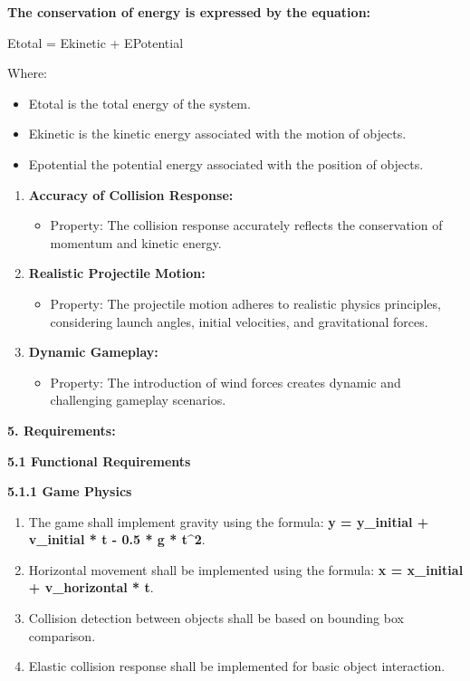 \documentclass[
]{article}
\begin{document}
\textbf{The conservation of energy is expressed by the equation:}

Etotal = Ekinetic + EPotential

Where:

\begin{itemize}
\item
  Etotal is the total energy of the system.
\item
  Ekinetic is the kinetic energy associated with the motion of objects.
\item
  Epotential the potential energy associated with the position of
  objects.
\end{itemize}

\begin{enumerate}
\def\labelenumi{\arabic{enumi}.}
\setcounter{enumi}{1}
\item
  \textbf{Accuracy of Collision Response:}

  \begin{itemize}
  \item
    Property: The collision response accurately reflects the
    conservation of momentum and kinetic energy.
  \end{itemize}
\item
  \textbf{Realistic Projectile Motion:}

  \begin{itemize}
  \item
    Property: The projectile motion adheres to realistic physics
    principles, considering launch angles, initial velocities, and
    gravitational forces.
  \end{itemize}
\item
  \textbf{Dynamic Gameplay:}

  \begin{itemize}
  \item
    Property: The introduction of wind forces creates dynamic and
    challenging gameplay scenarios.
  \end{itemize}
\end{enumerate}

\protect\hypertarget{qb}{}{}\textbf{5. Requirements:}

\protect\hypertarget{qbb}{}{}\textbf{5.1 Functional Requirements}

\textbf{5.1.1 Game Physics}

\begin{enumerate}
\def\labelenumi{\arabic{enumi}.}
\item
  The game shall implement gravity using the formula: \textbf{y =
  y\_initial + v\_initial * t - 0.5 * g * t\^{}2}.
\item
  Horizontal movement shall be implemented using the formula: \textbf{x
  = x\_initial + v\_horizontal * t}.
\item
  Collision detection between objects shall be based on bounding box
  comparison.
\item
  Elastic collision response shall be implemented for basic object
  interaction.
\end{enumerate}
\end{document}
